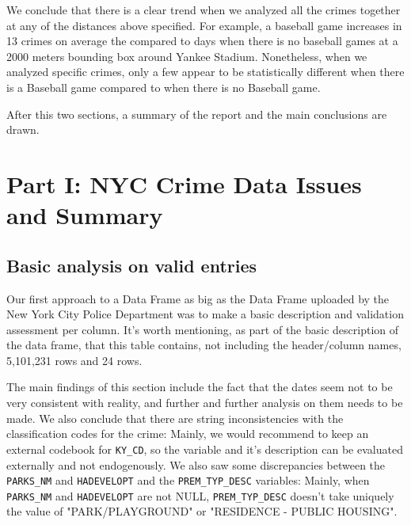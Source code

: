 \documentclass{article}
\begin{document}
We conclude that there is a clear trend when we analyzed all the crimes together at any of the distances above specified. For example, a baseball game increases in 13 crimes on average the compared to days when there is no baseball games at a 2000 meters bounding box around Yankee Stadium. Nonetheless, when we analyzed specific crimes, only a few appear to be statistically different when there is a Baseball game compared to when there is no Baseball game. 

After this two sections, a summary of the report and the main conclusions are drawn. 

\pagebreak
\section{Part I: NYC Crime Data Issues and Summary}
\subsection{Basic analysis on valid entries}

Our first approach to a Data Frame as big as the Data Frame uploaded by the New York City Police Department was to make a basic description and validation assessment per column. It's worth mentioning, as part of the basic description of the data frame, that this table contains, not including the header/column names, 5,101,231 rows and 24 rows. 

The main findings of this section include the fact that the dates seem not to be very consistent with reality, and further and further analysis on them needs to be made. We also conclude that there are string inconsistencies with the classification codes for the crime: Mainly, we would recommend to keep an external codebook for \texttt{KY\_CD}, so the variable and it's description can be evaluated externally and not endogenously.  We also saw some discrepancies between the \texttt{PARKS\_NM} and  \texttt{HADEVELOPT} and the \texttt{PREM\_TYP\_DESC} variables: Mainly, when \texttt{PARKS\_NM} and  \texttt{HADEVELOPT} are not NULL, \texttt{PREM\_TYP\_DESC} doesn't take uniquely the value of "PARK/PLAYGROUND" or "RESIDENCE - PUBLIC HOUSING". 
\end{document}
